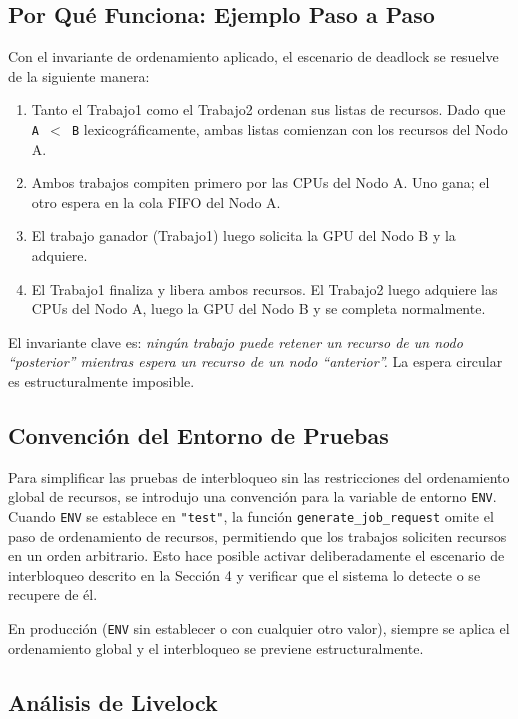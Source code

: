 \documentclass[12pt,a4paper]{article}
\begin{document}
\subsection{Por Qué Funciona: Ejemplo Paso a Paso}

Con el invariante de ordenamiento aplicado, el escenario de deadlock se resuelve de la siguiente manera:

\begin{enumerate}
  \item Tanto el Trabajo1 como el Trabajo2 ordenan sus listas de recursos. Dado que \texttt{A $<$ B} lexicográficamente, ambas listas comienzan con los recursos del Nodo A.
  \item Ambos trabajos compiten primero por las CPUs del Nodo A. Uno gana; el otro espera en la cola FIFO del Nodo A.
  \item El trabajo ganador (Trabajo1) luego solicita la GPU del Nodo B y la adquiere.
  \item El Trabajo1 finaliza y libera ambos recursos. El Trabajo2 luego adquiere las CPUs del Nodo A, luego la GPU del Nodo B y se completa normalmente.
\end{enumerate}

El invariante clave es: \textit{ningún trabajo puede retener un recurso de un nodo ``posterior'' mientras espera un recurso de un nodo ``anterior''.} La espera circular es estructuralmente imposible.

\subsection{Convención del Entorno de Pruebas}

Para simplificar las pruebas de interbloqueo sin las restricciones del ordenamiento global de recursos, se introdujo una convención para la variable de entorno \texttt{ENV}. Cuando \texttt{ENV} se establece en \texttt{"test"}, la función \texttt{generate\_job\_request} omite el paso de ordenamiento de recursos, permitiendo que los trabajos soliciten recursos en un orden arbitrario. Esto hace posible activar deliberadamente el escenario de interbloqueo descrito en la Sección 4 y verificar que el sistema lo detecte o se recupere de él.

En producción (\texttt{ENV} sin establecer o con cualquier otro valor), siempre se aplica el ordenamiento global y el interbloqueo se previene estructuralmente.

\subsection{Análisis de Livelock}
\end{document}
